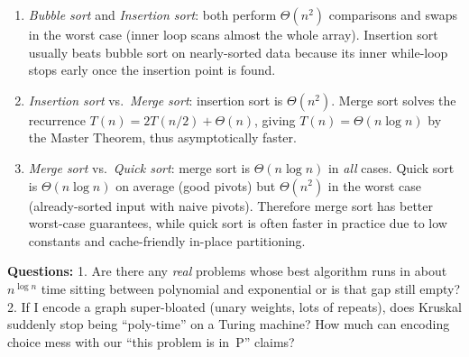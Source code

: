 \documentclass{article}
\theoremstyle{theorem}
\theoremstyle{definition}
\theoremstyle{remark}
\begin{document}
\begin{enumerate}
  \item \emph{Bubble sort} and \emph{Insertion sort}:  
        both perform $\Theta(n^{2})$ comparisons and swaps in the worst case  
        (inner loop scans almost the whole array).  
        Insertion sort usually beats bubble sort on nearly-sorted data because
        its inner while-loop stops early once the insertion point is found.

  \item \emph{Insertion sort} vs.\ \emph{Merge sort}:  
        insertion sort is $\Theta(n^{2})$.  
        Merge sort solves the recurrence $T(n)=2T(n/2)+\Theta(n)$,  
        giving $T(n)=\Theta(n\log n)$ by the Master Theorem, thus asymptotically faster.

  \item \emph{Merge sort} vs.\ \emph{Quick sort}:  
        merge sort is $\Theta(n\log n)$ in \emph{all} cases.  
        Quick sort is $\Theta(n\log n)$ on average (good pivots) but  
        $\Theta(n^{2})$ in the worst case (already-sorted input with naive pivots).  
        Therefore merge sort has better worst-case guarantees,  
        while quick sort is often faster in practice due to low constants  
        and cache-friendly in-place partitioning.
\end{enumerate}
\textbf{Questions: } 1. Are there any \emph{real} problems whose best algorithm runs in about $n^{\log n}$ time sitting between polynomial and exponential or is that gap still empty?  2. If I encode a graph super-bloated (unary weights, lots of repeats), does Kruskal suddenly stop being ``poly-time'' on a Turing machine? How much can encoding choice mess with our ``this problem is in~P'' claims?
\end{document}
